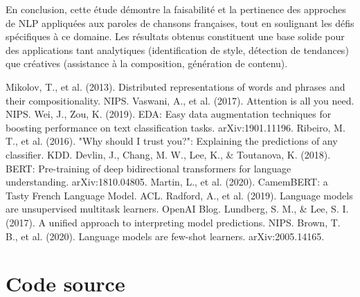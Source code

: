 \documentclass[a4paper,11pt]{article}
\begin{document}
En conclusion, cette étude démontre la faisabilité et la pertinence des approches de NLP appliquées aux paroles de chansons françaises, tout en soulignant les défis spécifiques à ce domaine. Les résultats obtenus constituent une base solide pour des applications tant analytiques (identification de style, détection de tendances) que créatives (assistance à la composition, génération de contenu).


\begin{thebibliography}{9}
 Mikolov, T., et al. (2013). Distributed representations of words and phrases and their compositionality. NIPS.
 Vaswani, A., et al. (2017). Attention is all you need. NIPS.
 Wei, J., Zou, K. (2019). EDA: Easy data augmentation techniques for boosting performance on text classification tasks. arXiv:1901.11196.
 Ribeiro, M. T., et al. (2016). "Why should I trust you?": Explaining the predictions of any classifier. KDD.
 Devlin, J., Chang, M. W., Lee, K., & Toutanova, K. (2018). BERT: Pre-training of deep bidirectional transformers for language understanding. arXiv:1810.04805.
 Martin, L., et al. (2020). CamemBERT: a Tasty French Language Model. ACL.
 Radford, A., et al. (2019). Language models are unsupervised multitask learners. OpenAI Blog.
 Lundberg, S. M., & Lee, S. I. (2017). A unified approach to interpreting model predictions. NIPS.
 Brown, T. B., et al. (2020). Language models are few-shot learners. arXiv:2005.14165.
\end{thebibliography}

\appendix
\section{Code source}
\label{app:code}
\end{document}
